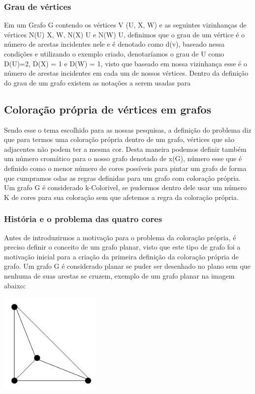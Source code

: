 \documentclass[12pt]{article}
\begin{document}
   	\subsubsection{Grau de vértices}
    Em um Grafo G contendo os vértices V (U, X, W) e as seguintes vizinhanças de vértices N(U) {X, W}, N(X) {U} e N(W) {U}, definimos que o grau de um vértice é o número de arestas incidentes nele e é denotado como d(v), baseado nessa condições e utilizando o exemplo criado, denotaríamos o grau de U como D(U)=2, D(X) = 1 e D(W) = 1, visto que baseado em nossa vizinhança esse é o número de arestas incidentes em cada um de nossos vértices.
    Dentro da definição do grau de um grafo existem as notações a serem usadas para 
    
    \subsection{ Coloração própria de vértices em grafos}
    Sendo esse o tema escolhido para as nossas pesquisas, a definição do problema diz que para termos uma coloração própria dentro de um grafo, vértices que são adjacentes não podem ter a mesma cor. Desta maneira podemos definir também um número cromático para o nosso grafo denotado de x(G), número esse que é definido como o menor número de cores possíveis para pintar um grafo de forma que cumpramos odas as regras definidas para um grafo com coloração própria.
    Um grafo G é considerado k-Colorivel, se pudermos dentro dele usar um número K de cores para sua coloração sem que afetemos a regra da coloração própria.
    
    \subsubsection{História e o problema das quatro cores}
    
    Antes de introduzirmos a motivação para o problema da coloração própria, é preciso definir o conceito de um grafo planar, visto que este tipo de grafo foi a motivação inicial para a criação da primeira definição da coloração própria de grafo.
    Um grafo G é considerado planar se puder ser desenhado no plano sem que nenhuma de suas arestas se cruzem, exemplo de um grafo planar na imagem abaixo:
    
    {\centering  \includegraphics[width=5cm,height=5cm]{grafoPlanar}\par} 
    
\end{document}
